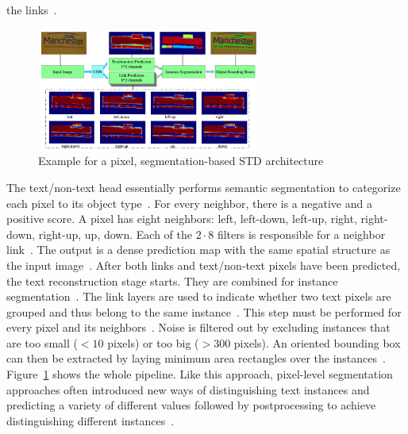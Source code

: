 the links~\citep{deng_pixellink_2018}.
\begin{figure}[ht]
    \centering
    \includegraphics[width=0.65\textwidth]{img/STD-seg-based-architecture-Deng-PixelLink-2018.png}
    \caption[Pixel, segmentation-based STD architecture]{%
        Example for a pixel, segmentation-based STD
        architecture~\citep{deng_pixellink_2018}\label{fig:STD-segbased-pixel-architecture}
    }
\end{figure}
The text/non-text head essentially performs semantic segmentation to categorize each
pixel to its object type~\citep{deng_pixellink_2018}.
For every neighbor, there is a negative and a positive score.
A pixel has eight neighbors: left, left-down, left-up, right, right-down, right-up, up, down.
Each of the $2\cdot8$ filters is responsible for a neighbor link~\citep{deng_pixellink_2018}.
The output is a dense prediction map with the same spatial structure as the input
image~\citep{deng_pixellink_2018}.
After both links and text/non-text pixels have been predicted, the text reconstruction stage starts.
They are combined for instance segmentation~\citep{deng_pixellink_2018}.
The link layers are used to indicate whether two text pixels are grouped and thus belong to
the same instance~\citep{deng_pixellink_2018}.
This step must be performed for every pixel and its neighbors~\citep{deng_pixellink_2018}.
Noise is filtered out by excluding instances that are too small ($<10$ pixels) or too big ($>300$
pixels).
An oriented bounding box can then be extracted by laying minimum area rectangles over the
instances~\citep{deng_pixellink_2018}.
Figure~\ref{fig:STD-segbased-pixel-architecture} shows the whole pipeline.
Like this approach, pixel-level segmentation approaches often introduced new ways of
distinguishing text instances and predicting a variety of different values followed by
postprocessing to achieve distinguishing different
instances~\citep{deng_pixellink_2018,liao_real-time_2019,ferrari_textsnake_2018}.

